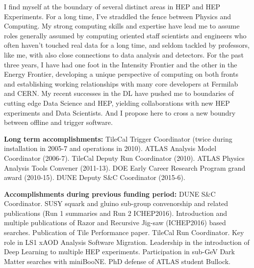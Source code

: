 %

I find myself at the boundary of several distinct areas in HEP and HEP
Experiments. For a long time, I've straddled the fence between Physics
and Computing.  My strong computing skills and expertise have lead me
to assume roles generally assumed by computing oriented staff
scientists and engineers who often haven't touched real data for a
long time, and seldom tackled by professors, like me, with also close
connections to data analysis and detectors.  For the past three years,
I have had one foot in the Intensity Frontier and the other in the
Energy Frontier, developing a unique perspective of computing on both
fronts and establishing working relationships with many core
developers at Fermilab and CERN. My recent successes in the DL have
pushed me to boundaries of cutting edge Data Science and HEP, yielding
collaborations with new HEP experiments and Data Scientists. And I
propose here to cross a new boundry between offline and trigger
software. 


{\bf Long term accomplishments:} TileCal Trigger Coordinator (twice during
installation in 2005-7 and operations in 2010). ATLAS Analysis Model
Coordinator (2006-7). TileCal Deputy Run Coordinator (2010). ATLAS
Physics Analysis Tools Convener (2011-13). DOE Early Career Research
Program grand award (2010-15). DUNE Deputy S\&C Coordinator (2015-6).

{\bf Accomplishments during previous funding period:} DUNE S\&C
Coordinator.  SUSY squark and gluino sub-group convenorship and
related publications (Run 1 summaries and Run 2
ICHEP2016). Introduction and multiple publications of Razor and
Recursive Jig-saw (ICHEP2016) based searches. Publication of Tile
Performance paper. TileCal Run Coordinator. Key role in LS1 xAOD
Analysis Software Migration.  Leadership in the introduction of Deep
Learning to multiple HEP experiments. Participation in sub-GeV Dark
Matter searches with miniBooNE. PhD defense of ATLAS
student Bullock.


